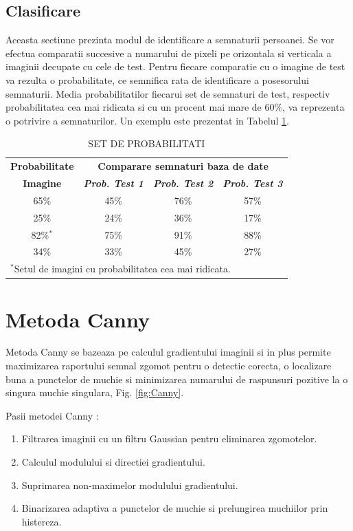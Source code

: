 \documentclass[conference]{IEEEtran}
\begin{document}
\subsection{Clasificare}
Aceasta sectiune prezinta modul de identificare a semnaturii persoanei. Se vor efectua comparatii succesive a numarului de pixeli pe orizontala si verticala a imaginii decupate cu cele de test. Pentru fiecare comparatie cu o imagine de test va rezulta o probabilitate, ce semnifica rata de identificare a posesorului semnaturii. Media probabilitatilor fiecarui set de semnaturi de test, respectiv probabilitatea cea mai ridicata si cu un procent mai mare de 60\%, va reprezenta o potrivire a semnaturilor. Un exemplu este prezentat in Tabelul \ref{Probabilitati}.

\begin{table}[h!]
	\caption{SET DE PROBABILITATI}
	\begin{center}
		\begin{tabular}{|c|c|c|c|}
			\hline
			\textbf{Probabilitate}&\multicolumn{3}{|c|}{\textbf{Comparare semnaturi baza de date}} \\
			\cline{2-4} 
			\textbf{Imagine} & \textbf{\textit{Prob. Test 1}}& \textbf{\textit{Prob. Test 2}}& \textbf{\textit{Prob. Test 3}} \\
			\hline
			65\% & 45\% & 76\% & 57\% \\
			25\% & 24\% & 36\% & 17\% \\
			82\%$^{\mathrm{*}}$ & 75\% & 91\% & 88\% \\
			34\% & 33\% & 45\% & 27\% \\
			\hline
			\multicolumn{4}{l}{$^{\mathrm{*}}$Setul de imagini cu probabilitatea cea mai ridicata.}
		\end{tabular}
		\label{Probabilitati}
	\end{center}
\end{table}

\section{Metoda Canny} \label{sec:Canny}
Metoda Canny se bazeaza pe calculul gradientului imaginii si in plus permite maximizarea raportului semnal zgomot pentru o detectie corecta, o localizare buna a punctelor de muchie si minimizarea numarului de raspunsuri pozitive la o singura muchie singulara, Fig. \ref{fig:Canny}.

Pasii metodei Canny \cite{b3}:
\begin{enumerate}[label=\Alph*.]
	\item Filtrarea imaginii cu un filtru Gaussian pentru eliminarea zgomotelor.
	\item Calculul modulului si directiei gradientului.
	\item Suprimarea non-maximelor modulului gradientului.
	\item Binarizarea adaptiva a punctelor de muchie si prelungirea muchiilor prin histereza.
\end{enumerate}
\end{document}
